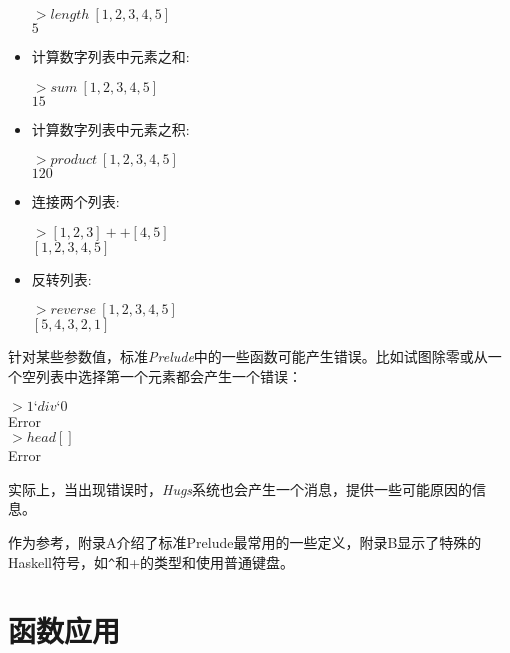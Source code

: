 \begin{itemize}
\noindent\hspace*{1cm} $> length~[1, 2, 3, 4, 5]$\\
\hspace*{1cm} $5$

\item 计算数字列表中元素之和:

\noindent\hspace*{1cm} $> sum~[1, 2, 3, 4, 5]$\\
\hspace*{1cm} $15$

\item 计算数字列表中元素之积:

\noindent\hspace*{1cm} $> product~[1, 2, 3, 4, 5]$\\
\hspace*{1cm} $120$

\item 连接两个列表:

\noindent\hspace*{1cm} $> [1, 2, 3] ++ [4, 5]$\\
\hspace*{1cm} $[1, 2, 3, 4, 5]$

\item 反转列表:

\noindent\hspace*{1cm} $> reverse~[1, 2, 3, 4, 5]$\\
\hspace*{1cm} $[5, 4, 3, 2, 1]$

\end{itemize}

针对某些参数值，标准\textit{Prelude}中的一些函数可能产生错误。比如试图除零或从一个空列表中选择第一个元素都会产生一个错误：

\noindent\hspace*{1cm} $> 1 ‘div ‘ 0$\\
\hspace*{1cm} Error\\
\hspace*{1cm} $> head [ ]$\\
\hspace*{1cm} Error

实际上，当出现错误时，\textit{Hugs}系统也会产生一个消息，提供一些可能原因的信息。

作为参考，附录A介绍了标准Prelude最常用的一些定义，附录B显示了特殊的Haskell符号，如\verb|^|和+的类型和使用普通键盘。

\section{函数应用}

